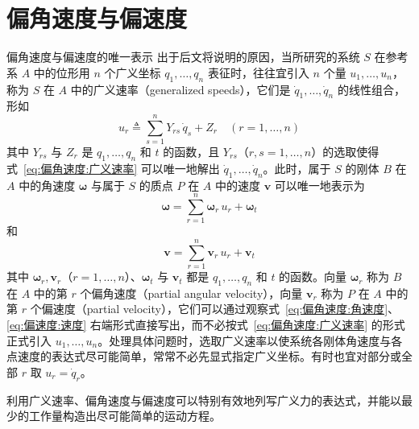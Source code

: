 \section{偏角速度与偏速度}
\begin{myTheorem}{偏角速度与偏速度的唯一表示}
出于后文将说明的原因，当所研究的系统 $S$ 在参考系 $A$ 中的位形用 $n$ 个广义坐标 $q_1,\dots,q_n$ 表征时，往往宜引入 $n$ 个量 $u_1,\dots,u_n$，称为 $S$ 在 $A$ 中的广义速率（generalized speeds），它们是 $\dot{q}_1,\dots,\dot{q}_n$ 的线性组合，形如
\begin{equation}
    u_r \triangleq \sum_{s=1}^{n}Y_{rs}\,\dot{q}_s + Z_r \quad (r=1,\dots,n)
    \label{eq:偏角速度:广义速率}
\end{equation}
其中 $Y_{rs}$ 与 $Z_r$ 是 $q_1,\dots,q_n$ 和 $t$ 的函数，且 $Y_{rs}$（$r,s=1,\dots,n$）的选取使得式~\eqref{eq:偏角速度:广义速率} 可以唯一地解出 $\dot{q}_1,\dots,\dot{q}_n$。此时，属于 $S$ 的刚体 $B$ 在 $A$ 中的角速度 $\bm{\omega}$ 与属于 $S$ 的质点 $P$ 在 $A$ 中的速度 $\mathbf{v}$ 可以唯一地表示为
\begin{equation}
    \bm{\omega} = \sum_{r=1}^{n}\bm{\omega}_r\,u_r + \bm{\omega}_t
    \label{eq:偏角速度:角速度}
\end{equation}
和
\begin{equation}
    \mathbf{v} = \sum_{r=1}^{n}\mathbf{v}_r\,u_r + \mathbf{v}_t
    \label{eq:偏速度:速度}
\end{equation}
其中 $\bm{\omega}_r,\mathbf{v}_r$（$r=1,\dots,n$）、$\bm{\omega}_t$ 与 $\mathbf{v}_t$ 都是 $q_1,\dots,q_n$ 和 $t$ 的函数。向量 $\bm{\omega}_r$ 称为 $B$ 在 $A$ 中的第 $r$ 个偏角速度（partial angular velocity），向量 $\mathbf{v}_r$ 称为 $P$ 在 $A$ 中的第 $r$ 个偏速度（partial velocity），它们可以通过观察式~\eqref{eq:偏角速度:角速度}、\eqref{eq:偏速度:速度} 右端形式直接写出，而不必按式~\eqref{eq:偏角速度:广义速率} 的形式正式引入 $u_1,\dots,u_n$。处理具体问题时，选取广义速率以使系统各刚体角速度与各点速度的表达式尽可能简单，常常不必先显式指定广义坐标。有时也宜对部分或全部 $r$ 取 $u_r=\dot{q}_r$。
\end{myTheorem}

利用广义速率、偏角速度与偏速度可以特别有效地列写广义力的表达式，并能以最少的工作量构造出尽可能简单的运动方程。

